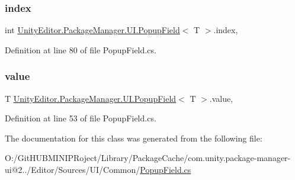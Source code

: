 \subsubsection{\texorpdfstring{index}{index}}
{\footnotesize\ttfamily int \mbox{\hyperlink{class_unity_editor_1_1_package_manager_1_1_u_i_1_1_popup_field}{Unity\+Editor.\+Package\+Manager.\+U\+I.\+Popup\+Field}}$<$ T $>$.index\hspace{0.3cm}{\ttfamily [get]}, {\ttfamily [set]}}



Definition at line 80 of file Popup\+Field.\+cs.

\mbox{\label{class_unity_editor_1_1_package_manager_1_1_u_i_1_1_popup_field_aa27a791d6881262b65dea46b32578313}} 
\subsubsection{\texorpdfstring{value}{value}}
{\footnotesize\ttfamily T \mbox{\hyperlink{class_unity_editor_1_1_package_manager_1_1_u_i_1_1_popup_field}{Unity\+Editor.\+Package\+Manager.\+U\+I.\+Popup\+Field}}$<$ T $>$.value\hspace{0.3cm}{\ttfamily [get]}, {\ttfamily [set]}}



Definition at line 53 of file Popup\+Field.\+cs.



The documentation for this class was generated from the following file\+:\begin{DoxyCompactItemize}
\item 
O\+:/\+Git\+H\+U\+B\+M\+I\+N\+I\+P\+Roject/\+Library/\+Package\+Cache/com.\+unity.\+package-\/manager-\/ui@2../\+Editor/\+Sources/\+U\+I/\+Common/\mbox{\hyperlink{_popup_field_8cs}{Popup\+Field.\+cs}}\end{DoxyCompactItemize}
